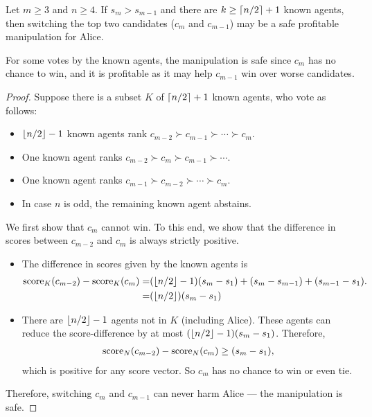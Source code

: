 \begin{lemmarep}
\label{lem:sm>sm1}
Let $m\geq 3$ and $n\geq 4$.
If $s_m > s_{m-1}$
and there are $k\geq \left\lceil n/2 \right\rceil+1$ known agents,
then
switching the top two candidates ($c_m$ and $c_{m-1}$) may be a safe profitable manipulation for Alice.
\end{lemmarep}
\begin{proofsketch}
For some votes by the known agents, the manipulation is safe since $c_m$ has no chance to win, and it is profitable as it may help $c_{m-1}$ win over worse candidates.
\end{proofsketch}
\begin{proof}
Suppose there is a subset $K$ of $\left\lceil n/2 \right\rceil+1$ known agents, who vote as follows:
\begin{itemize}
\item $\left\lfloor n/2 \right\rfloor-1$ known agents rank $c_{m-2} \succ c_{m-1} \succ \cdots \succ c_m$.
\item One known agent ranks $c_{m-2} \succ c_m \succ
c_{m-1} \succ \cdots $. 
\item One known agent ranks $c_{m-1} \succ c_{m-2} \succ \cdots \succ c_m$. 
\item In case $n$ is odd, the remaining known agent abstains.
\end{itemize}
We first show that $c_m$ cannot win. To this end, we show that the difference in scores between $c_{m-2}$ and $c_m$ is always strictly positive.
\begin{itemize}
\item The difference in scores given by the known agents is 
\begin{align*}
\operatorname{score}_K(c_{m-2})-\operatorname{score}_K(c_m) =
&
(\left\lfloor n/2 \right\rfloor-1)(s_m-s_1) 
+ (s_m-s_{m-1})
+ (s_{m-1}-s_1).
\\
=&
(\left\lfloor n/2 \right\rfloor)(s_m-s_1) 
\end{align*}
\item There are
$\left\lfloor n/2 \right\rfloor-1$ agents not in $K$ (including Alice).
These agents can reduce the score-difference by at most 
$(\left\lfloor n/2 \right\rfloor-1)(s_m-s_1)$.
Therefore, 
\begin{align*}
\operatorname{score}_N(c_{m-2})-\operatorname{score}_N(c_m) \geq (s_m-s_1),
\end{align*}
which is positive for any score vector.
So $c_m$ has no chance to win or even tie.
\end{itemize}
Therefore, switching $c_m$ and $c_{m-1}$ can never harm Alice --- the manipulation is safe.


\end{proof}
